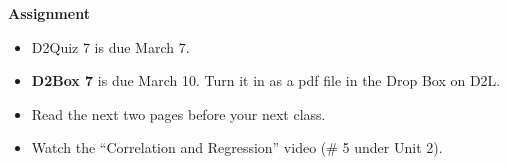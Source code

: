 \noindent
{\bf Assignment} \vspace{-.2in}
\begin{itemize}
\item  D2Quiz 7 is due March 7. 
\item {\bf D2Box 7} is due March 10.
    Turn it in as a pdf file in the Drop Box on D2L.
\item Read the next two pages before your next class.
\item Watch the ``Correlation and Regression'' video (\# 5 under Unit 2).
\end{itemize}
